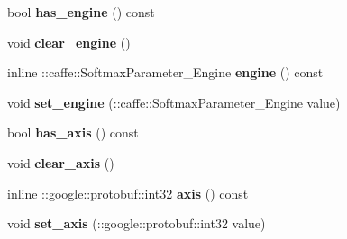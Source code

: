 \begin{DoxyCompactItemize}
\item 
\mbox{\label{classcaffe_1_1_softmax_parameter_ab7f17271ce5bcf33d1c4c5d8ef1f38ea}} 
bool {\bfseries has\+\_\+engine} () const
\item 
\mbox{\label{classcaffe_1_1_softmax_parameter_a4b09c5782df4c21c0ed9692cf2a87234}} 
void {\bfseries clear\+\_\+engine} ()
\item 
\mbox{\label{classcaffe_1_1_softmax_parameter_acb5f3aabf0048595575e79816c981f3b}} 
inline \+::caffe\+::\+Softmax\+Parameter\+\_\+\+Engine {\bfseries engine} () const
\item 
\mbox{\label{classcaffe_1_1_softmax_parameter_a24de52a2fc9d1de33c85ba31747318ab}} 
void {\bfseries set\+\_\+engine} (\+::caffe\+::\+Softmax\+Parameter\+\_\+\+Engine value)
\item 
\mbox{\label{classcaffe_1_1_softmax_parameter_a6b932eca1f1df736197d37c6c360ba8e}} 
bool {\bfseries has\+\_\+axis} () const
\item 
\mbox{\label{classcaffe_1_1_softmax_parameter_aac31e961bf87522946bf10fb6b8bd8b7}} 
void {\bfseries clear\+\_\+axis} ()
\item 
\mbox{\label{classcaffe_1_1_softmax_parameter_a67b73cd051b32d9607b382738cace574}} 
inline \+::google\+::protobuf\+::int32 {\bfseries axis} () const
\item 
\mbox{\label{classcaffe_1_1_softmax_parameter_a9142f993e06a0c1bf7a9c0de29f2cdd3}} 
void {\bfseries set\+\_\+axis} (\+::google\+::protobuf\+::int32 value)
\end{DoxyCompactItemize}
